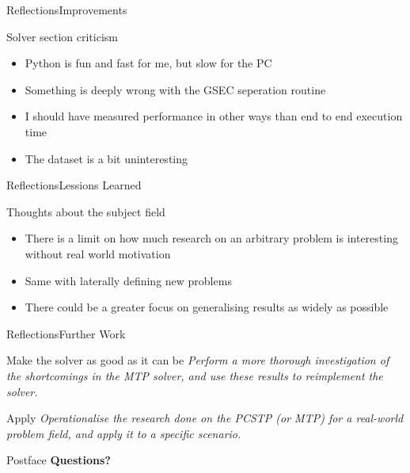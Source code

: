 \documentclass[rgb,dvipsnames]{beamer}
\begin{document}
\begin{frame}{Reflections}{Improvements}
  \begin{block}{Solver section criticism}
    \begin{itemize}[<+->]
    \item Python is fun and fast for me, but slow for the PC
    \item Something is deeply wrong with the GSEC seperation routine
    \item I should have measured performance in other ways than end to end execution time
    \item The dataset is a bit uninteresting
    \end{itemize}
  \end{block}
\end{frame}


\begin{frame}{Reflections}{Lessions Learned}
  \begin{block}{Thoughts about the subject field}
    \begin{itemize}[<+->]
    \item There is a limit on how much research on an arbitrary problem is interesting
      without real world motivation
    \item Same with laterally defining new problems
    \item There could be a greater focus on generalising
      results as widely as possible
    \end{itemize}
  \end{block}
\end{frame}

\begin{frame}{Reflections}{Further Work}
  \begin{block}{Make the solver as good as it can be}
    \textit{Perform a more thorough investigation of the shortcomings in the MTP
    solver, and use these results to reimplement the solver.}
  \end{block}

  \begin{block}{Apply}
    \textit{Operationalise the research done on the PCSTP (or MTP) for a real-world
    problem field, and apply it to a specific scenario.}
  \end{block}
\end{frame}


\begin{frame}{Postface}
  \pause
  \large\textbf{Questions?}
\end{frame}
\end{document}
